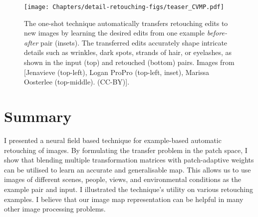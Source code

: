 \begin{figure}
  \texttt{[image: Chapters/detail-retouching-figs/teaser\_CVMP.pdf]}
  \caption{The one-shot technique automatically transfers retouching edits to new images by learning the desired edits from one example \textit{before-after} pair (insets). The transferred edits accurately shape intricate details such as wrinkles, dark spots, strands of hair, or eyelashes, as shown in the input (top) and retouched (bottom) pairs. Images from [Jenavieve (top-left), Logan ProPro (top-left, inset), Marissa Oosterlee (top-middle). (CC-BY)].}
  \label{fig:DRteaser}
\end{figure}
















\section{Summary}
I presented a neural field based technique for example-based automatic retouching of images. By formulating the transfer problem in the patch space, I show that blending multiple transformation matrices with patch-adaptive weights can be utilised to learn an accurate and generalisable map. This allows us to use images of different scenes, people, views, and environmental conditions as the example pair and input. I illustrated the technique's utility on various retouching examples. I believe that our image map representation can be helpful in many other image processing problems.


